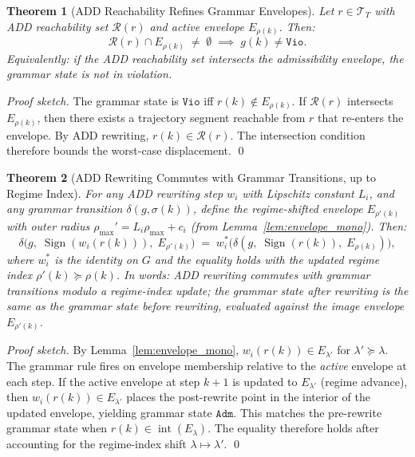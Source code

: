 \documentclass[11pt,a4paper]{article}
\theoremstyle{plain}
\newtheorem{theorem}{Theorem}[section]
\theoremstyle{definition}
\theoremstyle{remark}
\DeclareMathOperator{\Sign}{Sign}
\DeclareMathOperator{\interior}{int}
\begin{document}
\begin{theorem}[ADD Reachability Refines Grammar Envelopes]
\label{thm:add_refines}
  Let $r \in \mathcal{T}_T$ with ADD reachability set $\mathcal{R}(r)$ and active envelope
  $E_{\rho(k)}$. Then:
  \begin{equation}
    \mathcal{R}(r) \cap E_{\rho(k)} \;\neq\; \emptyset \;\implies\; g(k) \neq \mathtt{Vio}.
  \end{equation}
  Equivalently: if the ADD reachability set intersects the admissibility envelope, the grammar
  state is not in violation.
\end{theorem}
\begin{proof}[Proof sketch]
  The grammar state is $\mathtt{Vio}$ iff $r(k) \notin E_{\rho(k)}$. If $\mathcal{R}(r)$
  intersects $E_{\rho(k)}$, then there exists a trajectory segment reachable from $r$ that
  re-enters the envelope. By ADD rewriting, $r(k) \in \mathcal{R}(r)$. The intersection
  condition therefore bounds the worst-case displacement. \qed
\end{proof}

\begin{theorem}[ADD Rewriting Commutes with Grammar Transitions, up to Regime Index]
\label{thm:add_grammar_commute}
  For any ADD rewriting step $w_i$ with Lipschitz constant $L_i$, and any grammar transition
  $\delta(g, \sigma(k))$, define the \emph{regime-shifted envelope} $E_{\rho'(k)}$ with
  outer radius $\rho_{\max}' = L_i \rho_{\max} + c_i$ (from Lemma~\ref{lem:envelope_mono}).
  Then:
  \begin{equation}
    \delta\bigl(g,\; \Sign(w_i(r(k))),\; E_{\rho'(k)}\bigr)
    \;=\; w_i^*\bigl(\delta(g,\; \Sign(r(k)),\; E_{\rho(k)})\bigr),
  \end{equation}
  where $w_i^*$ is the identity on $G$ and the equality holds with the updated regime index
  $\rho'(k) \succeq \rho(k)$. In words: ADD rewriting commutes with grammar transitions
  \emph{modulo a regime-index update}; the grammar state after rewriting is the same as the
  grammar state before rewriting, evaluated against the image envelope $E_{\rho'(k)}$.
\end{theorem}
\begin{proof}[Proof sketch]
  By Lemma~\ref{lem:envelope_mono}, $w_i(r(k)) \in E_{\lambda'}$ for $\lambda' \succeq \lambda$.
  The grammar rule fires on envelope membership relative to the \emph{active} envelope at each
  step. If the active envelope at step $k+1$ is updated to $E_{\lambda'}$ (regime advance),
  then $w_i(r(k)) \in E_{\lambda'}$ places the post-rewrite point in the interior of the
  updated envelope, yielding grammar state $\mathtt{Adm}$. This matches the pre-rewrite
  grammar state when $r(k) \in \interior(E_{\lambda})$. The equality therefore holds after
  accounting for the regime-index shift $\lambda \mapsto \lambda'$. \qed
\end{proof}
\end{document}
